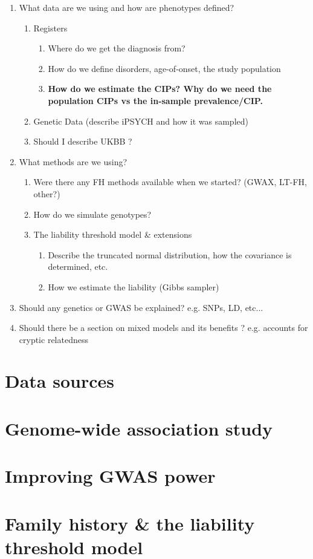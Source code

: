 
\begin{enumerate}
	\item What data are we using and how are phenotypes defined?
		\begin{enumerate}
			\item Registers
			\begin{enumerate}
				\item Where do we get the diagnosis from? 
				\item How do we define disorders, age-of-onset, the study population
				\item \textbf{ How do we estimate the CIPs? Why do we need the population CIPs vs the in-sample prevalence/CIP.}
			\end{enumerate}
			\item Genetic Data (describe iPSYCH and how it was sampled)
			\item Should I describe UKBB ?
		\end{enumerate}
	\item What methods are we using?
	\begin{enumerate}
		\item Were there any FH methods available when we started? (GWAX, LT-FH, other?)
		\item How do we simulate genotypes?
		\item The liability threshold model \& extensions
		\begin{enumerate}
			\item Describe the truncated normal distribution, how the covariance is determined, etc.
			\item How we estimate the liability (Gibbs sampler)
		\end{enumerate}
	\end{enumerate} 
	\item Should any genetics or GWAS be explained? e.g. SNPs, LD, etc... 
	\item Should there be a section on mixed models and its benefits ? e.g. accounts for cryptic relatedness
\end{enumerate}


\section{Data sources}




\section{Genome-wide association study}


\section{Improving GWAS power}


\section{Family history \& the liability threshold model}






